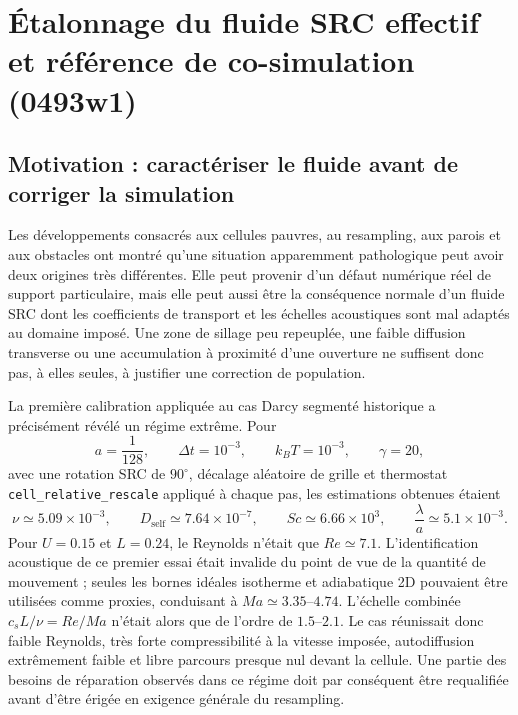 \documentclass[11pt,a4paper]{article}
\begin{document}
\section{Étalonnage du fluide SRC effectif et référence de co-simulation (0493w1)}
\label{sec:etalonnage-src-effectif}

\subsection{Motivation : caractériser le fluide avant de corriger la simulation}

Les développements consacrés aux cellules pauvres, au resampling, aux parois et aux obstacles ont montré qu'une situation apparemment pathologique peut avoir deux origines très différentes. Elle peut provenir d'un défaut numérique réel de support particulaire, mais elle peut aussi être la conséquence normale d'un fluide SRC dont les coefficients de transport et les échelles acoustiques sont mal adaptés au domaine imposé. Une zone de sillage peu repeuplée, une faible diffusion transverse ou une accumulation à proximité d'une ouverture ne suffisent donc pas, à elles seules, à justifier une correction de population.

La première calibration appliquée au cas Darcy segmenté historique a précisément révélé un régime extrême. Pour
\begin{equation}
  a=\frac{1}{128},\qquad
  \Delta t=10^{-3},\qquad
  k_BT=10^{-3},\qquad
  \gamma=20,
\end{equation}
avec une rotation SRC de $90^\circ$, décalage aléatoire de grille et thermostat \texttt{cell\_relative\_rescale} appliqué à chaque pas, les estimations obtenues étaient
\begin{equation}
  \nu\simeq5.09\times10^{-3},\qquad
  D_{\mathrm{self}}\simeq7.64\times10^{-7},\qquad
  Sc\simeq6.66\times10^{3},\qquad
  \frac{\lambda}{a}\simeq5.1\times10^{-3}.
\end{equation}
Pour $U=0.15$ et $L=0.24$, le Reynolds n'était que $Re\simeq7.1$. L'identification acoustique de ce premier essai était invalide du point de vue de la quantité de mouvement ; seules les bornes idéales isotherme et adiabatique 2D pouvaient être utilisées comme proxies, conduisant à $Ma\simeq3.35$--$4.74$. L'échelle combinée $c_sL/\nu=Re/Ma$ n'était alors que de l'ordre de $1.5$--$2.1$. Le cas réunissait donc faible Reynolds, très forte compressibilité à la vitesse imposée, autodiffusion extrêmement faible et libre parcours presque nul devant la cellule. Une partie des besoins de réparation observés dans ce régime doit par conséquent être requalifiée avant d'être érigée en exigence générale du resampling.
\end{document}
